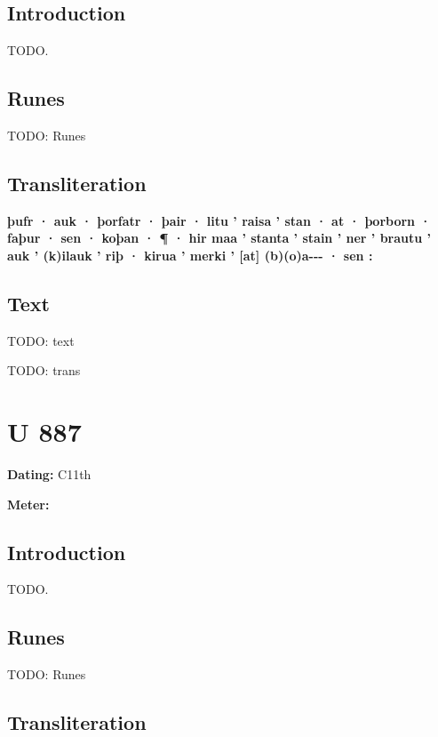 \subsection{Introduction}

TODO.

\subsection{Runes}

TODO: Runes%

\subsection{Transliteration}

\textbf{þufr · auk · þorfatr · þair · litu ’ raisa ’ stan · at · þorborn · faþur · sen · koþan · ¶ · hir maa ’ stanta ’ stain ’ ner ’ brautu ’ auk ’ (k)ilauk ’ riþ · kirua ’ merki ’ [at] (b)(o)a-{}-{}- · sen :}

\subsection{Text}

\bpg\bpa[0]%
TODO: text\epa

\bpb TODO: trans\epb\epg

\sectionline\clearpage


\section{U 887}

\begin{flushright}%
\textbf{Dating:} C11th

\textbf{Meter:} \Fornyrdislag
\end{flushright}%

\subsection{Introduction}

TODO.

\subsection{Runes}

TODO: Runes%

\subsection{Transliteration}

